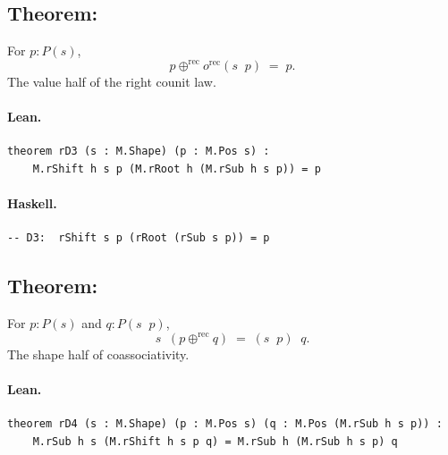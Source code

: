 \documentclass[11pt,a4paper]{article}
\begin{document}
\subsection{Theorem: }

\begin{thm}
For $p : P(s)$,
\[
  p \oplus^\mathrm{rec} o^\mathrm{rec}(s \mathop{\downarrow^\mathrm{rec}} p) \;=\; p.
\]
The value half of the right counit law.
\end{thm}

\paragraph{Lean.}
\begin{lstlisting}[style=lean]
theorem rD3 (s : M.Shape) (p : M.Pos s) :
    M.rShift h s p (M.rRoot h (M.rSub h s p)) = p
\end{lstlisting}

\paragraph{Haskell.}
\begin{lstlisting}[style=haskell]
-- D3:  rShift s p (rRoot (rSub s p)) = p
\end{lstlisting}


\subsection{Theorem: }

\begin{thm}
For $p : P(s)$ and $q : P(s \mathop{\downarrow^\mathrm{rec}} p)$,
\[
  s \mathop{\downarrow^\mathrm{rec}} (p \oplus^\mathrm{rec} q)
  \;=\;
  (s \mathop{\downarrow^\mathrm{rec}} p) \mathop{\downarrow^\mathrm{rec}} q.
\]
The shape half of coassociativity.
\end{thm}

\paragraph{Lean.}
\begin{lstlisting}[style=lean]
theorem rD4 (s : M.Shape) (p : M.Pos s) (q : M.Pos (M.rSub h s p)) :
    M.rSub h s (M.rShift h s p q) = M.rSub h (M.rSub h s p) q
\end{lstlisting}
\end{document}
